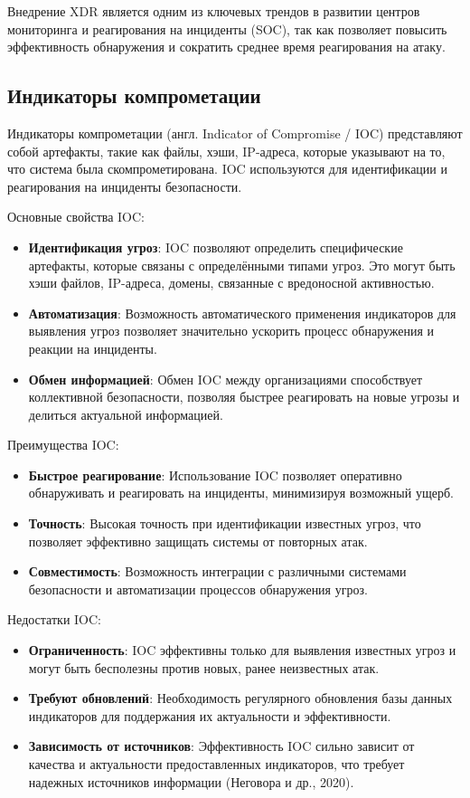 Внедрение XDR является одним из ключевых трендов в развитии центров мониторинга и реагирования на инциденты (SOC), так как позволяет повысить эффективность обнаружения и сократить среднее время реагирования на атаку.

\subsection{Индикаторы компрометации}

Индикаторы компрометации (англ. Indicator of Compromise / IOC) представляют собой артефакты, такие как файлы, хэши, IP-адреса, которые указывают на то, что система была скомпрометирована. IOC используются для идентификации и реагирования на инциденты безопасности.

Основные свойства IOC:
\begin{itemize}
    \item \textbf{Идентификация угроз}: IOC позволяют определить специфические артефакты, которые связаны с определёнными типами угроз. Это могут быть хэши файлов, IP-адреса, домены, связанные с вредоносной активностью.
    \item \textbf{Автоматизация}: Возможность автоматического применения индикаторов для выявления угроз позволяет значительно ускорить процесс обнаружения и реакции на инциденты.
    \item \textbf{Обмен информацией}: Обмен IOC между организациями способствует коллективной безопасности, позволяя быстрее реагировать на новые угрозы и делиться актуальной информацией.
\end{itemize}

Преимущества IOC:
\begin{itemize}
    \item \textbf{Быстрое реагирование}: Использование IOC позволяет оперативно обнаруживать и реагировать на инциденты, минимизируя возможный ущерб.
    \item \textbf{Точность}: Высокая точность при идентификации известных угроз, что позволяет эффективно защищать системы от повторных атак.
    \item \textbf{Совместимость}: Возможность интеграции с различными системами безопасности и автоматизации процессов обнаружения угроз.
\end{itemize}

Недостатки IOC:
\begin{itemize}
    \item \textbf{Ограниченность}: IOC эффективны только для выявления известных угроз и могут быть бесполезны против новых, ранее неизвестных атак.
    \item \textbf{Требуют обновлений}: Необходимость регулярного обновления базы данных индикаторов для поддержания их актуальности и эффективности.
    \item \textbf{Зависимость от источников}: Эффективность IOC сильно зависит от качества и актуальности предоставленных индикаторов, что требует надежных источников информации (Неговора и др., 2020).
\end{itemize}

